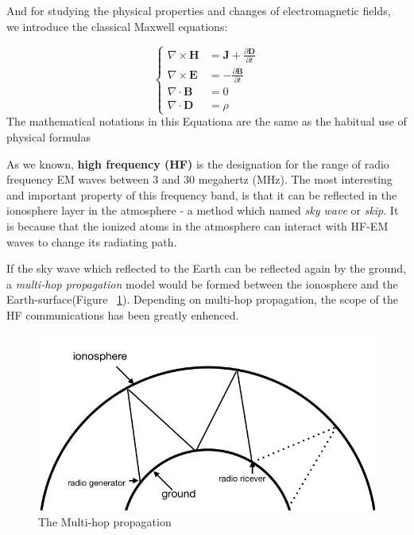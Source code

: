 \documentclass{mcmthesis}
\begin{document}
      And for studying the physical properties and changes of electromagnetic fields, we introduce the classical Maxwell equations:


      \begin{equation}\label{eq:Maxwell_new}
      \left\{
      \begin{aligned} %
          \nabla \times \textbf{H}  &= \textbf{J} + \frac{\partial\textbf{D}}{\partial t}       \\
          \nabla \times \textbf{E}  &= -\frac{\partial\textbf{B}}{\partial t}       \\
          \nabla   \cdot  \textbf{B}  &= 0       \\
          \nabla   \cdot  \textbf{D}  &= \rho
      \end{aligned}
      \right.
      \end{equation}
      The mathematical notations in this Equationa are the same as the habitual use of physical formulas


      As we known, \textbf{high frequency (HF)} is the designation for the range of radio frequency EM waves between 3 and 30 megahertz (MHz). The most interesting and important property of this frequency band, is that it can be reflected in the ionosphere layer in the atmosphere - a method which named \emph{sky wave} or \emph{skip}. It is because that the ionized atoms in the atmosphere can interact with HF-EM waves to change its radiating path.\cite{HF_EM}

      If the sky wave which reflected to the Earth can be reflected again by the ground, a \emph{multi-hop propagation} model would be formed between the ionosphere and the Earth-surface(Figure ~\ref{fig:Multi_hop}). Depending on multi-hop propagation, the scope of the HF communications has been greatly enhenced.

      \begin{figure}[ht]
      \centering
      \includegraphics[scale=0.5]{Multi_hop}
      \caption{The Multi-hop propagation}
      \label{fig:Multi_hop}
      \end{figure}
\end{document}
